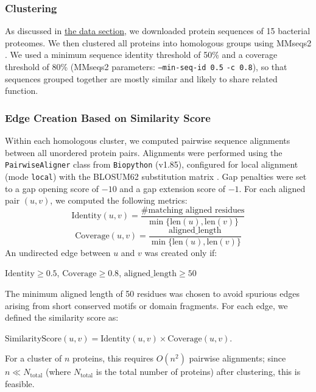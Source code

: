 \documentclass[11pt]{article}
\begin{document}
	\subsubsection{Clustering}
	As discussed in \hyperref[sec:data]{the data section}, we downloaded protein sequences of 15 bacterial proteomes. We then clustered all proteins into homologous groups using MMseqs2 \cite{Steinegger2017MMseqs2}. We used a minimum sequence identity threshold of 50\% and a coverage threshold of 80\% (MMseqs2 parameters: \texttt{--min-seq-id 0.5} \texttt{-c 0.8}), so that sequences grouped together are mostly similar and likely to share related function.
	
	\subsubsection[step 2]{Edge Creation Based on Similarity Score}
	\label{subsubsec:step2}
	Within each homologous cluster, we computed pairwise sequence alignments between all unordered protein pairs. Alignments were performed using the \texttt{PairwiseAligner} class from \texttt{Biopython} (v1.85), configured for local alignment (mode \texttt{local}) with the BLOSUM62 substitution matrix \cite{BLOSUM}. Gap penalties were set to a gap opening score of $-10$ and a gap extension score of $-1$.
	For each aligned pair $(u,v)$, we computed the following metrics:\\
	\begin{equation*}
	\text{Identity}(u,v) =
	\frac{\#\text{matching aligned residues}}
	{\min\{\text{len}(u), \text{len}(v)\}}
	\end{equation*}
	\begin{equation*}
	\text{Coverage}(u,v) =
	\frac{\text{aligned\_length}}
	{\min\{\text{len}(u), \text{len}(v)\}}
	\end{equation*}
	An undirected edge between $u$ and $v$ was created only if:
	\begin{center}
		$\text{Identity} \ge 0.5$, \quad
		$\text{Coverage} \ge 0.8$, \quad
		$\text{aligned\_length} \ge 50$
	\end{center}
	The minimum aligned length of 50 residues was chosen to avoid spurious edges arising from short conserved motifs or domain fragments. For each edge, we defined the similarity score as:
	\begin{center}
		$\text{SimilarityScore}(u,v) = \text{Identity}(u,v) \times \text{Coverage}(u,v).$
	\end{center}
	For a cluster of $n$ proteins, this requires $O(n^2)$ pairwise alignments; since $n \ll N_{\text{total}}$ (where $N_{\text{total}}$ is the total number of proteins) after clustering, this is feasible.
	
\end{document}
